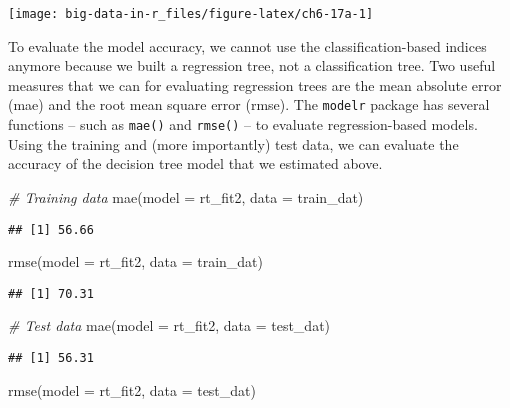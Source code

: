 \documentclass[
]{book}
\newenvironment{Shaded}{\begin{snugshade}}{\end{snugshade}}
\newcommand{\AttributeTok}[1]{\textcolor[rgb]{0.77,0.63,0.00}{#1}}
\newcommand{\CommentTok}[1]{\textcolor[rgb]{0.56,0.35,0.01}{\textit{#1}}}
\newcommand{\FunctionTok}[1]{\textcolor[rgb]{0.00,0.00,0.00}{#1}}
\newcommand{\NormalTok}[1]{#1}
\begin{document}
\texttt{[image: big-data-in-r\_files/figure-latex/ch6-17a-1]}

To evaluate the model accuracy, we cannot use the classification-based indices anymore because we built a regression tree, not a classification tree. Two useful measures that we can for evaluating regression trees are the mean absolute error (mae) and the root mean square error (rmse). The \texttt{modelr} package has several functions -- such as \texttt{mae()} and \texttt{rmse()} -- to evaluate regression-based models. Using the training and (more importantly) test data, we can evaluate the accuracy of the decision tree model that we estimated above.

\begin{Shaded}
\begin{Highlighting}[]
\CommentTok{\# Training data}
\FunctionTok{mae}\NormalTok{(}\AttributeTok{model =}\NormalTok{ rt\_fit2, }\AttributeTok{data =}\NormalTok{ train\_dat)}
\end{Highlighting}
\end{Shaded}

\begin{verbatim}
## [1] 56.66
\end{verbatim}

\begin{Shaded}
\begin{Highlighting}[]
\FunctionTok{rmse}\NormalTok{(}\AttributeTok{model =}\NormalTok{ rt\_fit2, }\AttributeTok{data =}\NormalTok{ train\_dat)}
\end{Highlighting}
\end{Shaded}

\begin{verbatim}
## [1] 70.31
\end{verbatim}

\begin{Shaded}
\begin{Highlighting}[]
\CommentTok{\# Test data}
\FunctionTok{mae}\NormalTok{(}\AttributeTok{model =}\NormalTok{ rt\_fit2, }\AttributeTok{data =}\NormalTok{ test\_dat)}
\end{Highlighting}
\end{Shaded}

\begin{verbatim}
## [1] 56.31
\end{verbatim}

\begin{Shaded}
\begin{Highlighting}[]
\FunctionTok{rmse}\NormalTok{(}\AttributeTok{model =}\NormalTok{ rt\_fit2, }\AttributeTok{data =}\NormalTok{ test\_dat)}
\end{Highlighting}
\end{Shaded}
\end{document}
